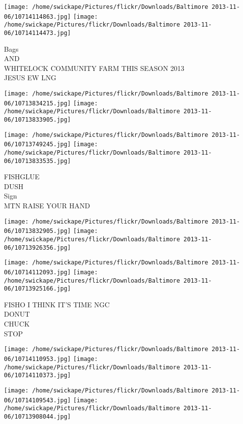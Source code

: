 \documentclass[10pt,letterpaper]{article}
\begin{document}
\texttt{[image: /home/swickape/Pictures/flickr/Downloads/Baltimore 2013-11-06/10714114863.jpg]}
\texttt{[image: /home/swickape/Pictures/flickr/Downloads/Baltimore 2013-11-06/10714114473.jpg]}

Bags\\
AND\\
WHITELOCK COMMUNITY FARM THIS SEASON 2013\\
JESUS EW LNG\\
\pagebreak

\texttt{[image: /home/swickape/Pictures/flickr/Downloads/Baltimore 2013-11-06/10713834215.jpg]}
\texttt{[image: /home/swickape/Pictures/flickr/Downloads/Baltimore 2013-11-06/10713833905.jpg]}

\texttt{[image: /home/swickape/Pictures/flickr/Downloads/Baltimore 2013-11-06/10713749245.jpg]}
\texttt{[image: /home/swickape/Pictures/flickr/Downloads/Baltimore 2013-11-06/10713833535.jpg]}

FISHGLUE\\
DUSH\\
Sign\\
MTN RAISE YOUR HAND\\
\pagebreak

\texttt{[image: /home/swickape/Pictures/flickr/Downloads/Baltimore 2013-11-06/10713832905.jpg]}
\texttt{[image: /home/swickape/Pictures/flickr/Downloads/Baltimore 2013-11-06/10713926356.jpg]}

\texttt{[image: /home/swickape/Pictures/flickr/Downloads/Baltimore 2013-11-06/10714112093.jpg]}
\texttt{[image: /home/swickape/Pictures/flickr/Downloads/Baltimore 2013-11-06/10713925166.jpg]}

FISHO I THINK IT'S TIME NGC\\
DONUT\\
CHUCK\\
STOP\\
\pagebreak

\texttt{[image: /home/swickape/Pictures/flickr/Downloads/Baltimore 2013-11-06/10714110953.jpg]}
\texttt{[image: /home/swickape/Pictures/flickr/Downloads/Baltimore 2013-11-06/10714110373.jpg]}

\texttt{[image: /home/swickape/Pictures/flickr/Downloads/Baltimore 2013-11-06/10714109543.jpg]}
\texttt{[image: /home/swickape/Pictures/flickr/Downloads/Baltimore 2013-11-06/10713908044.jpg]}
\end{document}
